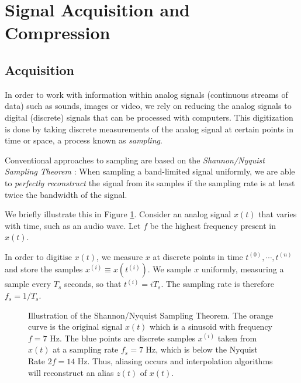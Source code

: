 \section{Signal Acquisition and Compression}
\subsection{Acquisition}
In order to work with information within analog signals (continuous streams of data) such as sounds, images or video, we rely on reducing the analog signals to digital (discrete) signals that can be processed with computers.
This digitization is done by taking discrete measurements of the analog signal at certain points in time or space, a process known as \emph{sampling}.

Conventional approaches to sampling are based on the \emph{Shannon/Nyquist Sampling Theorem} \cite{shannon1949}:
When sampling a band-limited signal uniformly, we are able to \emph{perfectly reconstruct} the signal from its samples if the sampling rate is at least twice the bandwidth of the signal.

We briefly illustrate this in Figure \ref{fig:nyquist}.
Consider an analog signal $x(t)$ that varies with time, such as an audio wave.
Let $f$ be the highest frequency present in $x(t)$.

In order to digitise $x(t)$, we measure $x$ at discrete points in time $t^{(0)}, \cdots, t^{(n)}$ and store the samples $x^{(i)} \equiv x(t^{(i)})$.
We sample $x$ uniformly, measuring a sample every $T_s$ seconds, so that $t^{(i)} = iT_s$.
The sampling rate is therefore $f_s = 1/T_s$.

\begin{figure}
\caption[Illustration of Nyquist Sampling]{Illustration of the Shannon/Nyquist Sampling Theorem. The orange curve is the original signal $x(t)$ which is a sinusoid with frequency $f = 7$ Hz. The blue points are discrete samples $x^{(i)}$ taken from $x(t)$ at a sampling rate $f_s = 7$ Hz, which is below the Nyquist Rate $2f = 14$ Hz. Thus, aliasing occurs and interpolation algorithms will reconstruct an alias $z(t)$ of $x(t)$.}
\label{fig:nyquist}
\end{figure}


